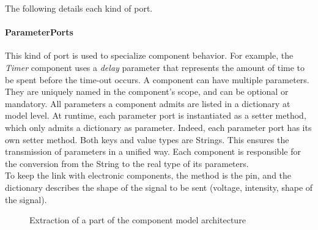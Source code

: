The following details each kind of port.\\

\paragraph{ParameterPorts}
This kind of port is used to specialize component behavior. For example, the \textit{Timer} component uses a \textit{delay} parameter that represents the amount of time to be spent before the time-out occurs. A component can have multiple parameters. They are uniquely named in the component's scope, and can be optional or mandatory. All parameters a component admits are listed in a dictionary at model level.
At runtime, each parameter port is instantiated as a setter method, which only admits a dictionary as parameter. Indeed, each parameter port has its own setter method. Both keys and value types are Strings. This ensures the transmission of parameters in a unified way. Each component is responsible for the conversion from the String to the real type of its parameters.\\
To keep the link with electronic components, the method is the pin, and the dictionary describes the shape of the signal to be sent (voltage, intensity, shape of the signal).

\begin{figure}
\begin{center}
\hspace{3mm}
\end{center}
\caption{Extraction of a part of the component model architecture}
\label{fig:component_type}
\end{figure}

